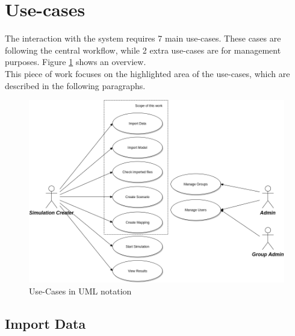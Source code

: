 \section{Use-cases}
The interaction with the system requires 7 main use-cases. These cases are following the central workflow, while 2 extra use-cases are for management purposes. Figure \ref{fig:use-cases} shows an overview.\\
This piece of work focuses on the highlighted area of the use-cases, which are described in the following paragraphs.
\begin{figure}[H]
	\centering\includegraphics[width=1\textwidth]{res/Use-Cases}
	\caption{Use-Cases in UML notation}
	\label{fig:use-cases}
\end{figure}

\subsection{Import Data}
\begin{usecase}
\end{usecase}

